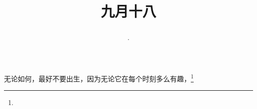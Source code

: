 \title{\date[d=20,m=10,y=2024][year:cn-y,年,month:cn,day:cn,日,·,weekday]·九月十八 }
无论如何，最好不要出生，因为无论它在每个时刻多么有趣，\footnote{ }

